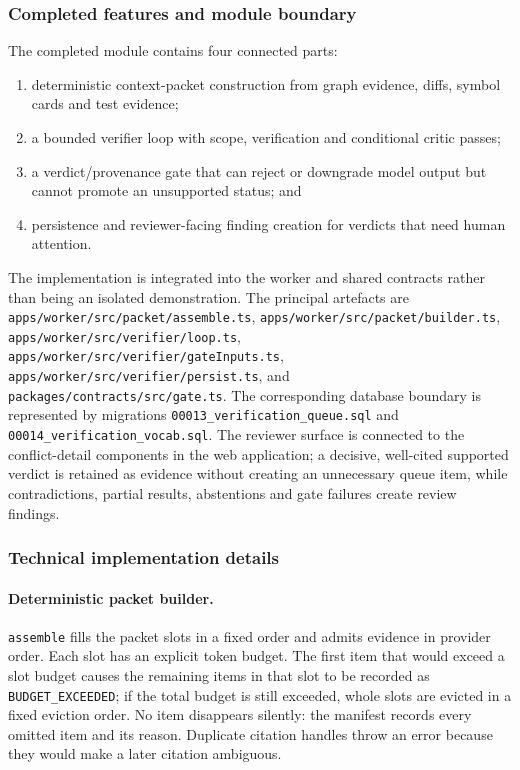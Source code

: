 \subsubsection{Completed features and module boundary}

The completed module contains four connected parts:

\begin{enumerate}
  \item deterministic context-packet construction from graph evidence, diffs,
        symbol cards and test evidence;
  \item a bounded verifier loop with scope, verification and conditional critic
        passes;
  \item a verdict/provenance gate that can reject or downgrade model output but
        cannot promote an unsupported status; and
  \item persistence and reviewer-facing finding creation for verdicts that need
        human attention.
\end{enumerate}

The implementation is integrated into the worker and shared contracts rather
than being an isolated demonstration. The principal artefacts are
\texttt{apps/worker/src/packet/assemble.ts},
\texttt{apps/worker/src/packet/builder.ts},
\texttt{apps/worker/src/verifier/loop.ts},
\texttt{apps/worker/src/verifier/gateInputs.ts},
\texttt{apps/worker/src/verifier/persist.ts}, and
\texttt{packages/contracts/src/gate.ts}. The corresponding database boundary
is represented by migrations \texttt{00013\_verification\_queue.sql} and
\texttt{00014\_verification\_vocab.sql}. The reviewer surface is connected to
the conflict-detail components in the web application; a decisive,
well-cited supported verdict is retained as evidence without creating an
unnecessary queue item, while contradictions, partial results, abstentions
and gate failures create review findings.

\subsubsection{Technical implementation details}

\paragraph{Deterministic packet builder.}
\texttt{assemble} fills the packet slots in a fixed order and admits evidence
in provider order. Each slot has an explicit token budget. The first item that
would exceed a slot budget causes the remaining items in that slot to be
recorded as \texttt{BUDGET\_EXCEEDED}; if the total budget is still exceeded,
whole slots are evicted in a fixed eviction order. No item disappears silently:
the manifest records every omitted item and its reason. Duplicate citation
handles throw an error because they would make a later citation ambiguous.


